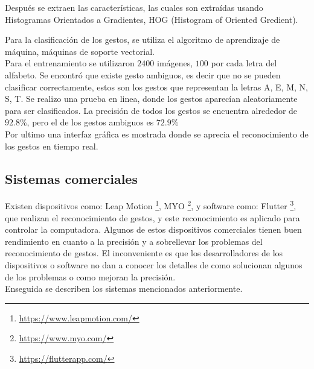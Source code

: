 Después se extraen las características, las cuales son extraídas usando Histogramas Orientados a Gradientes, HOG (Histogram of Oriented Gredient).  

Para la clasificación de los gestos, se utiliza el algoritmo de aprendizaje de máquina, máquinas de soporte vectorial.\\
Para el entrenamiento se utilizaron $2400$ imágenes, $100$ por cada letra del alfabeto. Se encontró que existe gesto ambiguos, es decir que no se pueden clasificar correctamente, estos son los gestos que representan la letras A, E, M, N, S, T. 
Se realizo una prueba en linea, donde los gestos aparecían aleatoriamente para ser clasificados. La precisión de todos los gestos se encuentra alrededor de $92.8 \%$, pero el de los gestos ambiguos es $72.9 \%$\\
Por ultimo una interfaz gráfica es mostrada donde se aprecia el reconocimiento de los gestos en tiempo real.  


 
\subsection{Sistemas comerciales}

Existen dispositivos como: Leap Motion \footnote{\label{LeapMotionFN} \url{https://www.leapmotion.com/}}, MYO \footnote{\label{MyoFN}  \url{https://www.myo.com/}}, y software como: Flutter \footnote{\label{FlutterFN} \url{ https://flutterapp.com/}}, que realizan el reconocimiento de gestos, y este reconocimiento es aplicado para controlar la computadora. Algunos de estos dispositivos comerciales tienen  buen rendimiento en cuanto a la precisión y a sobrellevar los problemas del reconocimiento de gestos. El inconveniente es que los desarrolladores de los dispositivos o software no dan a conocer los detalles de como solucionan algunos de los problemas o como mejoran la precisión. \\ 
Enseguida se describen los sistemas mencionados anteriormente.
 
